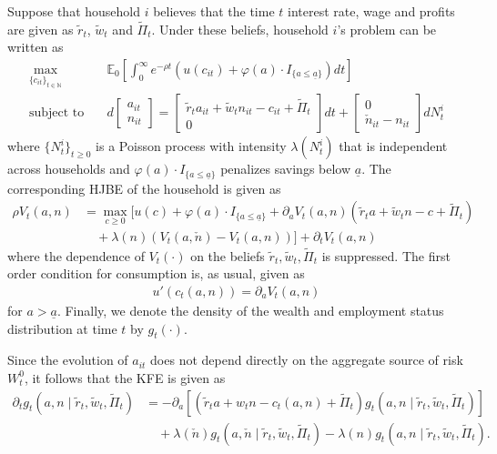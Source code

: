 \documentclass[notitlepage,a4paper,11pt]{report}
\numberwithin{section}{chapter}
\numberwithin{subsection}{section}
\newcommand{\expt}[2]{\mathbb{E}_{#1}\left[ #2 \right]}
\begin{document}
Suppose that household $i$ believes that the time $t$ interest rate, wage and profits are given as $\tilde{r}_t$, $\tilde{w}_t$ and $\tilde{\Pi}_t$. Under these beliefs, household $i$'s problem can be written as 
\begin{align*}
\max_{ \{ c_{it} \}_{t \in \mathbb{N}}} & \quad \expt{0}{ \int_0^{\infty} e^{-\rho t} \left( u( c_{it} ) + \varphi(a) \cdot I_{\{ a \leq \underline{a} \}} \right) dt  } \\[10pt]
\text{subject to} & \quad d \begin{bmatrix}
a_{it} \\
n_{it} 
\end{bmatrix} = \begin{bmatrix}
\tilde{r}_t a_{it} + \tilde{w}_t n_{it} - c_{it} + \tilde{\Pi}_t \\
0 
\end{bmatrix}  dt + \begin{bmatrix}
0 \\
\check{n}_{it} - n_{it} 
\end{bmatrix} d N_t^i
\end{align*}
where $\{ N_t^i \}_{t \geq 0}$ is a Poisson process with intensity $\lambda(N_t^i)$ that is independent across households and $\varphi(a) \cdot I_{\{ a \leq \underline{a} \}}$ penalizes savings below $\underline{a}$. The corresponding HJBE of the household is given as 
\begin{align*}
\rho V_t( a,n) & = \max_{ c \geq 0} \Bigg[ u(c) + \varphi(a) \cdot I_{\{a \leq \underline{a} \} } + \partial_a V_t(a,n) \left( \tilde{r}_{t}  a + \tilde{w}_t n - c + \tilde{\Pi}_t \right) \\
& \quad + \lambda(n) \left( V_t(a, \check{n}) - V_t( a, n) \right)  \Bigg] + \partial_t V_t(a,n)
\end{align*}
where the dependence of $V_t(\cdot)$ on the beliefs $\tilde{r}_{t}, \tilde{w}_t, \tilde{\Pi}_t$ is suppressed. The first order condition for consumption is, as usual, given as 
\begin{align*}
u'( c_t(a,n)) = \partial_a V_t(a,n) 
\end{align*}
for $a > \underline{a}$. Finally, we denote the density of the wealth and employment status distribution at time $t$ by $g_t(\cdot)$.  


Since the evolution of $a_{it}$ does not depend directly on the aggregate source of risk $W_t^0$, it follows that the KFE is given as 
\begin{align*}
\partial_t g_t( a,n \mid \tilde{r}_t, \tilde{w}_t, \tilde{\Pi}_t ) & = - \partial_a \left[ \left( \tilde{r}_t a + w_t n - c_t(a,n) + \tilde{\Pi}_t\right) g_t(a,n \mid \tilde{r}_t, \tilde{w}_t, \tilde{\Pi}_t )  \right] \\
& \quad + \lambda(\check{n}) g_t( a,\check{n} \mid \tilde{r}_t, \tilde{w}_t, \tilde{\Pi}_t )  - \lambda(n) g_t( a,n \mid \tilde{r}_t, \tilde{w}_t, \tilde{\Pi}_t ). 
\end{align*}
\end{document}
